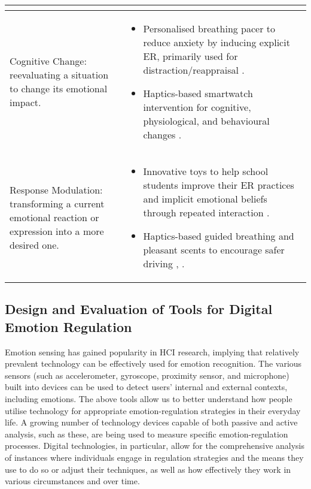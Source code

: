 \begin{table}[]
\begin{tabular}{m{6cm}m{10cm}}
\begin{itemize}
\end{itemize}                                       \\ \hline
Cognitive Change: reevaluating a situation to change its emotional impact.                                                               & \begin{itemize}
\item Personalised breathing pacer to reduce anxiety by inducing explicit ER, primarily used for distraction/reappraisal \cite{miri2020evaluating}.
\item Haptics-based smartwatch intervention for cognitive, physiological, and behavioural changes \cite{costa2019boostmeup}.
\end{itemize}                        \\ \hline
Response Modulation: transforming a current emotional reaction or expression into a more desired one.                                    & \begin{itemize}
\item Innovative toys to help school students improve their ER practices and implicit emotional beliefs through repeated interaction \cite{theofanopoulou2019smart}.
\item Haptics-based guided breathing and pleasant scents to encourage safer driving \cite{paredes2018just}, \cite{dmitrenko2020caroma}.
\end{itemize}                      \\ \hline
\end{tabular}
\end{table}
\raggedbottom

\subsection{Design and Evaluation of Tools for Digital Emotion Regulation}
Emotion sensing has gained popularity in HCI research, implying that relatively prevalent technology can be effectively used for emotion recognition. The various sensors (such as accelerometer, gyroscope, proximity sensor, and microphone) built into devices can be used to detect users' internal and external contexts, including emotions. The above tools allow us to better understand how people utilise technology for appropriate emotion-regulation strategies in their everyday life. A growing number of technology devices capable of both passive and active analysis, such as these, are being used to measure specific emotion-regulation processes. Digital technologies, in particular, allow for the comprehensive analysis of instances where individuals engage in regulation strategies and the means they use to do so or adjust their techniques, as well as how effectively they work in various circumstances and over time.

